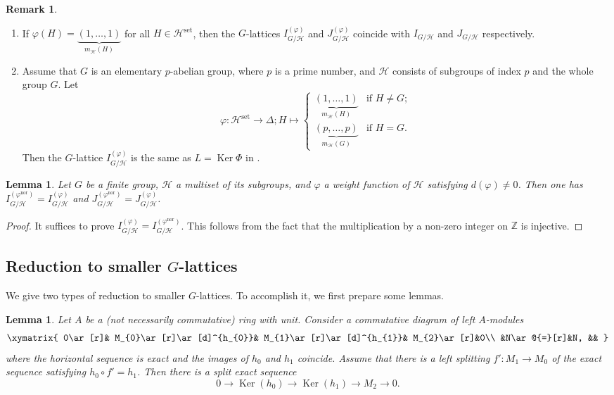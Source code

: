 \documentclass[12pt]{amsart}
\theoremstyle{plain}
\newtheorem{lem}[thm]{Lemma}
\theoremstyle{definition}
\newtheorem{rem}[thm]{Remark}
\numberwithin{thm}{section}
\numberwithin{equation}{section}
\newcommand{\Z}{\mathbb{Z}}
\newcommand{\cH}{\mathcal{H}}
\DeclareMathOperator{\Ker}{Ker}
\DeclareMathOperator{\nor}{nor}
\DeclareMathOperator{\set}{set}
\begin{document}
\begin{rem}
\begin{enumerate}
\item If $\varphi(H)=\underbrace{(1,\ldots,1)}_{m_{\cH}(H)}$ for all $H\in \cH^{\set}$, then the $G$-lattices $I_{G/\cH}^{(\varphi)}$ and $J_{G/\cH}^{(\varphi)}$ coincide with $I_{G/\cH}$ and $J_{G/\cH}$ respectively. 
\item Assume that $G$ is an elementary $p$-abelian group, where $p$ is a prime number, and $\cH$ consists of subgroups of index $p$ and the whole group $G$. Let
\begin{equation*}
\varphi \colon \cH^{\set} \rightarrow \Delta;H\mapsto 
\begin{cases}
\underbrace{(1,\ldots,1)}_{m_{\cH}(H)}&\text{if }H\neq G;\\
\underbrace{(p,\ldots,p)}_{m_{\cH}(G)}&\text{if }H=G. 
\end{cases}
\end{equation*}
Then the $G$-lattice $I_{G/\cH}^{(\varphi)}$ is the same as $L=\Ker \Phi$ in \cite[\S 2, l9--14]{Endo2001}. 
\end{enumerate}
\end{rem}

\begin{lem}\label{lem:dvci}
Let $G$ be a finite group, $\cH$ a multiset of its subgroups, and $\varphi$ a weight function of $\cH$ satisfying $d(\varphi)\neq 0$. Then one has $I_{G/\cH}^{(\varphi^{\nor})}=I_{G/\cH}^{(\varphi)}$ and $J_{G/\cH}^{(\varphi^{\nor})}=J_{G/\cH}^{(\varphi)}$. 
\end{lem}

\begin{proof}
It suffices to prove $I_{G/\cH}^{(\varphi)}=I_{G/\cH}^{(\varphi^{\nor})}$. This follows from the fact that the multiplication by a non-zero integer on $\Z$ is injective. 
\end{proof}

\subsection{Reduction to smaller $G$-lattices}\label{ssec:rdsm}

We give two types of reduction to smaller $G$-lattices. To accomplish it, we first prepare some lemmas.  

\begin{lem}\label{lem:spke}
Let $A$ be a (not necessarily commutative) ring with unit. Consider a commutative diagram of left $A$-modules
\begin{equation*}
\xymatrix{
0\ar[r]& M_{0}\ar[r]\ar[d]^{h_{0}}& M_{1}\ar[r]\ar[d]^{h_{1}}& M_{2}\ar[r]&0\\
&N\ar@{=}[r]&N, &&
}
\end{equation*}
where the horizontal sequence is exact and the images of $h_{0}$ and $h_{1}$ coincide. Assume that there is a left splitting $f'\colon M_{1}\rightarrow M_{0}$ of the exact sequence satisfying $h_{0}\circ f'=h_{1}$. Then there is a split exact sequence
\begin{equation*}
0\rightarrow \Ker(h_{0})\rightarrow \Ker(h_{1})\rightarrow M_{2}\rightarrow 0. 
\end{equation*}
\end{lem}
\end{document}
